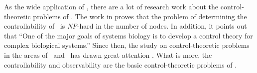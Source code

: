 


      

As the wide application of \BCNs, there are a lot of research work about the control-theoretic problems of \BCNs. The work in \cite{Akutsu2007Control} proves that the problem of determining the controllability of \BCNs\ is {\em NP}-hard in the number of nodes. In addition, it points out that ``One of the major goals of systems biology is to develop a control theory for complex biological systems.'' Since then, the study on control-theoretic problems in the areas of \BNs\ and \BCNs\ has drawn great attention \cite{cheng2009controllability, Zhao2010Input, Cheng2011Identification, Cheng2011Analysis,Fornasini2013Observability}. What is more, the controllability and observability are the basic control-theoretic problems of \BCNs. %

